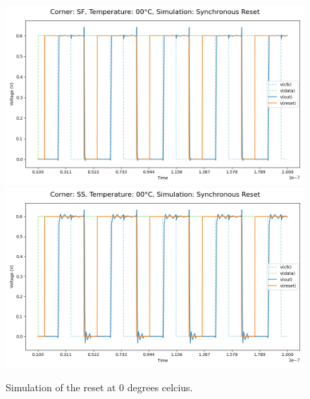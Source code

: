 \begin{figure}[H]
    \vspace{5pt}
    \includegraphics[height= 0.21\textheight]{figures/aimspice/0.600_0.1u_0.1u_0.3u_0.1u/functionality/SF00W3.png}
    \vspace{5pt}
    \includegraphics[height= 0.21\textheight]{figures/aimspice/0.600_0.1u_0.1u_0.3u_0.1u/functionality/SS00W3.png}
    \caption{Simulation of the reset at 0 degrees celcius.}
    \label{fig:aimspice_W3_0}
\end{figure}

\pagebreak

